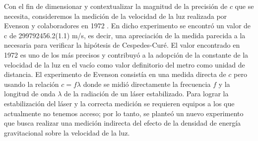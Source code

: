 Con el fin de dimensionar y contextualizar la magnitud de la precisión de $c$ que se necesita, consideremos la medición de la velocidad de la luz realizada por Evenson y colaboradores en 1972 \cite{Evenson1972Speed}. En dicho experimento se encontró un valor de c de 299792456.2(1.1) m/s, es decir, una apreciación de la medida parecida a la necesaria para verificar la hipótesis de Cespedes-Curé. El valor encontrado en 1972 es uno de los más precisos y contribuyó a la adopción de la constante de la velocidad de la luz en el vacío como valor definitorio del metro como unidad de distancia. El experimento de Evenson consistía en una medida directa de $c$ pero usando la relación $c=f \lambda$ donde se midió directamente la frecuencia $f$ y la longitud de onda $\lambda$ de la radiación de un láser estabilizado. Para lograr la estabilización del láser y la correcta medición se requieren equipos a los que actualmente no tenemos acceso; por lo tanto, se planteó un nuevo experimento que busca realizar una medición indirecta del efecto de la densidad de energía gravitacional sobre la velocidad de la luz.
